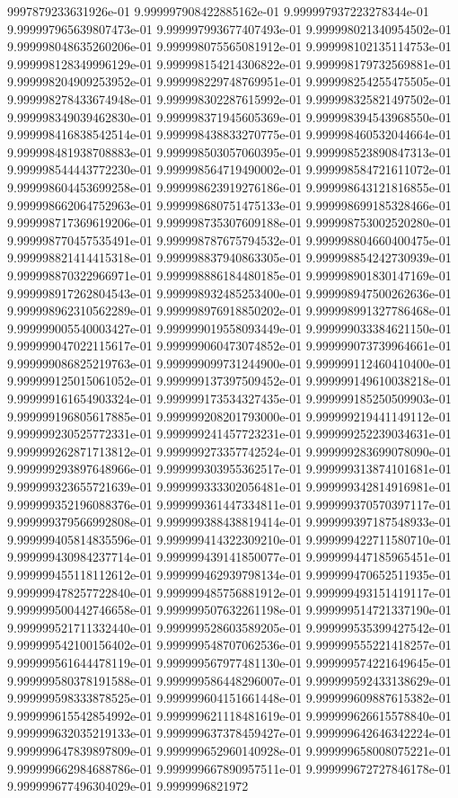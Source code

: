 9997879233631926e-01	9.999997908422885162e-01	9.999997937223278344e-01	9.999997965639807473e-01	9.999997993677407493e-01	9.999998021340954502e-01	9.999998048635260206e-01	9.999998075565081912e-01	9.999998102135114753e-01	9.999998128349996129e-01	9.999998154214306822e-01	9.999998179732569881e-01	9.999998204909253952e-01	9.999998229748769951e-01	9.999998254255475505e-01	9.999998278433674948e-01	9.999998302287615992e-01	9.999998325821497502e-01	9.999998349039462830e-01	9.999998371945605369e-01	9.999998394543968550e-01	9.999998416838542514e-01	9.999998438833270775e-01	9.999998460532044664e-01	9.999998481938708883e-01	9.999998503057060395e-01	9.999998523890847313e-01	9.999998544443772230e-01	9.999998564719490002e-01	9.999998584721611072e-01	9.999998604453699258e-01	9.999998623919276186e-01	9.999998643121816855e-01	9.999998662064752963e-01	9.999998680751475133e-01	9.999998699185328466e-01	9.999998717369619206e-01	9.999998735307609188e-01	9.999998753002520280e-01	9.999998770457535491e-01	9.999998787675794532e-01	9.999998804660400475e-01	9.999998821414415318e-01	9.999998837940863305e-01	9.999998854242730939e-01	9.999998870322966971e-01	9.999998886184480185e-01	9.999998901830147169e-01	9.999998917262804543e-01	9.999998932485253400e-01	9.999998947500262636e-01	9.999998962310562289e-01	9.999998976918850202e-01	9.999998991327786468e-01	9.999999005540003427e-01	9.999999019558093449e-01	9.999999033384621150e-01	9.999999047022115617e-01	9.999999060473074852e-01	9.999999073739964661e-01	9.999999086825219763e-01	9.999999099731244900e-01	9.999999112460410400e-01	9.999999125015061052e-01	9.999999137397509452e-01	9.999999149610038218e-01	9.999999161654903324e-01	9.999999173534327435e-01	9.999999185250509903e-01	9.999999196805617885e-01	9.999999208201793000e-01	9.999999219441149112e-01	9.999999230525772331e-01	9.999999241457723231e-01	9.999999252239034631e-01	9.999999262871713812e-01	9.999999273357742524e-01	9.999999283699078090e-01	9.999999293897648966e-01	9.999999303955362517e-01	9.999999313874101681e-01	9.999999323655721639e-01	9.999999333302056481e-01	9.999999342814916981e-01	9.999999352196088376e-01	9.999999361447334811e-01	9.999999370570397117e-01	9.999999379566992808e-01	9.999999388438819414e-01	9.999999397187548933e-01	9.999999405814835596e-01	9.999999414322309210e-01	9.999999422711580710e-01	9.999999430984237714e-01	9.999999439141850077e-01	9.999999447185965451e-01	9.999999455118112612e-01	9.999999462939798134e-01	9.999999470652511935e-01	9.999999478257722840e-01	9.999999485756881912e-01	9.999999493151419117e-01	9.999999500442746658e-01	9.999999507632261198e-01	9.999999514721337190e-01	9.999999521711332440e-01	9.999999528603589205e-01	9.999999535399427542e-01	9.999999542100156402e-01	9.999999548707062536e-01	9.999999555221418257e-01	9.999999561644478119e-01	9.999999567977481130e-01	9.999999574221649645e-01	9.999999580378191588e-01	9.999999586448296007e-01	9.999999592433138629e-01	9.999999598333878525e-01	9.999999604151661448e-01	9.999999609887615382e-01	9.999999615542854992e-01	9.999999621118481619e-01	9.999999626615578840e-01	9.999999632035219133e-01	9.999999637378459427e-01	9.999999642646342224e-01	9.999999647839897809e-01	9.999999652960140928e-01	9.999999658008075221e-01	9.999999662984688786e-01	9.999999667890957511e-01	9.999999672727846178e-01	9.999999677496304029e-01	9.9999996821972
